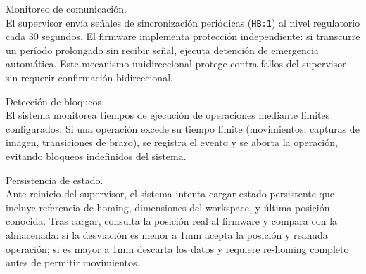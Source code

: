 Monitoreo de comunicación.\\
\noindent
El supervisor envía señales de sincronización periódicas (\texttt{HB:1}) al nivel regulatorio cada 30 segundos. El firmware implementa protección independiente: si transcurre un período prolongado sin recibir señal, ejecuta detención de emergencia automática. Este mecanismo unidireccional protege contra fallos del supervisor sin requerir confirmación bidireccional.

Detección de bloqueos.\\
\noindent El sistema monitorea tiempos de ejecución de operaciones mediante límites configurados. Si una operación excede su tiempo límite (movimientos, capturas de imagen, transiciones de brazo), se registra el evento y se aborta la operación, evitando bloqueos indefinidos del sistema.

Persistencia de estado.\\
\noindent Ante reinicio del supervisor, el sistema intenta cargar estado persistente que incluye referencia de homing, dimensiones del workspace, y última posición conocida. Tras cargar, consulta la posición real al firmware y compara con la almacenada: si la desviación es menor a 1mm acepta la posición y reanuda operación; si es mayor a 1mm descarta los datos y requiere re-homing completo antes de permitir movimientos.
